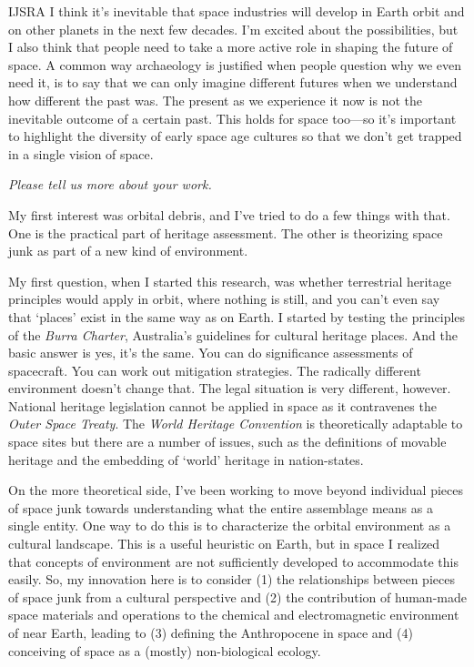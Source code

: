 \begin{labeling}{IJSRA}
	I think it’s inevitable that space industries will develop in Earth orbit and on other planets in the next few decades. I’m excited about the possibilities, but I also think that people need to take a more active role in shaping the future of space. A common way archaeology is justified when people question why we even need it, is to say that we can only imagine different futures when we understand how different the past was. The present as we experience it now is not the inevitable outcome of a certain past. This holds for space too—so it’s important to highlight the diversity of early space age cultures so that we don’t get trapped in a single vision of space.

	\item[IJSRA] \emph{Please tell us more about your work.}

	\item[AG] My first interest was orbital debris, and I’ve tried to do a few things with that. One is the practical part of heritage assessment. The other is theorizing space junk as part of a new kind of environment.

	My first question, when I started this research, was whether terrestrial heritage principles would apply in orbit, where nothing is still, and you can’t even say that ‘places’ exist in the same way as on Earth. I started by testing the principles of the \emph{Burra Charter}, Australia’s guidelines for cultural heritage places. And the basic answer is yes, it’s the same. You can do significance assessments of spacecraft. You can work out mitigation strategies. The radically different environment doesn’t change that. The legal situation is very different, however. National heritage legislation cannot be applied in space as it contravenes the \emph{Outer Space Treaty}. The \emph{World Heritage Convention} is theoretically adaptable to space sites but there are a number of issues, such as the definitions of movable heritage and the embedding of ‘world’ heritage in nation-states.

	On the more theoretical side, I’ve been working to move beyond individual pieces of space junk towards understanding what the entire assemblage means as a single entity. One way to do this is to characterize the orbital environment as a cultural landscape. This is a useful heuristic on Earth, but in space I realized that concepts of environment are not sufficiently developed to accommodate this easily. So, my innovation here is to consider (1) the relationships between pieces of space junk from a cultural perspective and (2) the contribution of human-made space materials and operations to the chemical and electromagnetic environment of near Earth, leading to (3) defining the Anthropocene in space and (4) conceiving of space as a (mostly) non-biological ecology.


\end{labeling}
